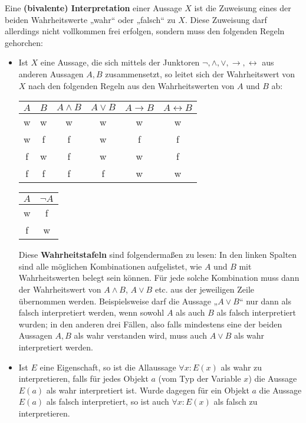 \begin{defin}[Interpretation] \label{def:interpretation}  
    Eine \textbf{(bivalente) Interpretation} einer Aussage $X$ ist die Zuweisung eines der beiden Wahrheitswerte „wahr“ oder „falsch“ zu $X$. Diese Zuweisung darf allerdings nicht vollkommen frei erfolgen, sondern muss den folgenden Regeln gehorchen:
    \begin{itemize}
        \item  Ist $X$ eine Aussage, die sich mittels der Junktoren $\neg,\land,\lor,\to,\leftrightarrow$ aus anderen Aussagen $A,B$ zusammensetzt, so leitet sich der Wahrheitswert von $X$ nach den folgenden Regeln aus den Wahrheitswerten von $A$ und $B$ ab:
        \begin{center}
        \begin{tabular}{cc|cccc}
            $A$ & $B$  & $A\land B$ & $A\lor B$ & $A\to B$ & $A\leftrightarrow B$ \\
            \hline
            w&w& w & w & w & w \\
            w&f& f & w & f & f \\
            f&w& f & w & w & f \\
            f&f& f & f & w & w
        \end{tabular} \qquad\quad \begin{tabular}{c|c}
            $A$ & $\neg A$ \\
            \hline
            w& f \\
            f& w
        \end{tabular}
        \end{center}
        Diese \textbf{Wahrheitstafeln} sind folgendermaßen zu lesen: In den linken Spalten sind alle möglichen Kombinationen aufgelistet, wie $A$ und $B$ mit Wahrheitswerten belegt sein können. Für jede solche Kombination muss dann der Wahrheitswert von $A\land B$, $A\lor B$ etc. aus der jeweiligen Zeile übernommen werden. Beispielsweise darf die Aussage „$A\lor B$“ nur dann als falsch interpretiert werden, wenn sowohl $A$ als auch $B$ als falsch interpretiert wurden; in den anderen drei Fällen, also falls mindestens eine der beiden Aussagen $A,B$ als wahr verstanden wird, muss auch $A\lor B$ als wahr interpretiert werden.
        \item Ist $E$ eine Eigenschaft, so ist die Allaussage $\forall x: E(x)$ als wahr zu interpretieren, falls für jedes Objekt $a$ (vom Typ der Variable $x$) die Aussage $E(a)$ als wahr interpretiert ist. Wurde dagegen für ein Objekt $a$ die Aussage $E(a)$ als falsch interpretiert, so ist auch $\forall x: E(x)$ als falsch zu interpretieren.

\end{itemize}
\end{defin}
